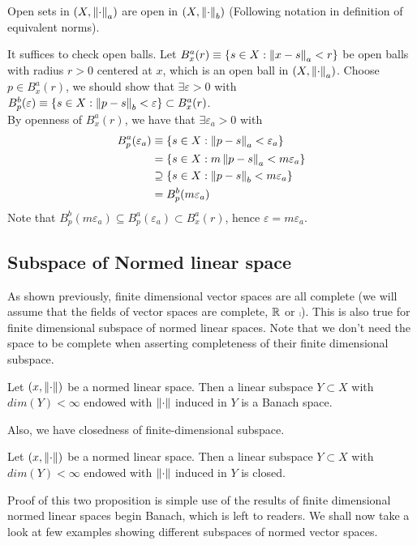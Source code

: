 \begin{proposition}\rm\nextline
	Open sets in $(X,\left\|{\cdot}\right\|_a)$ are open in $(X,\left\|{\cdot}\right\|_b)$ (Following notation in definition of equivalent norms).
	\begin{pf}{}{}
	It suffices to check open balls. Let $B^a_x(r)\equiv\{s\in X:\left\|{x-s}\right\|_a<r\}$ be open balls with radius $r>0$ centered at $x$, which is an open ball in $(X,\left\|{\cdot}\right\|_a)$. Choose $p\in B^a_x(r)$, we should show that $\exists \varepsilon>0$ with $B^b_p(\varepsilon)\equiv\{s\in X:\left\|{p-s}\right\|_b<\varepsilon\}\subset B^a_x(r)$.\\
	By openness of $B^a_x(r)$, we have that $\exists \varepsilon_a>0$ with
	\begin{equation}
		\begin{split}\nonumber
			B^a_p(\varepsilon_a)&\equiv\{s\in X:\left\|{p-s}\right\|_a<\varepsilon_a\}\\
			&=\{s\in X:m\left\|{p-s}\right\|_a<m\varepsilon_a\}\\
			&\supseteq \{s\in X:\left\|{p-s}\right\|_b<m\varepsilon_a\}\\
			&=B^b_p(m\varepsilon_a)
		\end{split}
	\end{equation}
	Note that $B^b_p(m\varepsilon_a)\subseteq B^a_p(\varepsilon_a)\subset B^a_x(r)$, hence $\varepsilon=m\varepsilon_a$.
	\end{pf}
	
\end{proposition}


\subsection{Subspace of Normed linear space}
As shown previously, finite dimensional vector spaces are all complete (we will assume that the fields of vector spaces are complete, $\mathbb{R}$ or $\comp$). This is also true for finite dimensional subspace of normed linear spaces. Note that we don't need the space to be complete when asserting completeness of their finite dimensional subspace.
\begin{proposition}
	\rm\nextline
	Let $(x,\left\|{\cdot}\right\|)$ be a normed linear space. Then a linear subspace $Y\subset X$ with $dim(Y)<\infty$ endowed with $\left\|{\cdot}\right\|$ induced in $Y$ is a Banach space.
\end{proposition}
Also, we have closedness of finite-dimensional subspace.
\begin{proposition}
	\rm\nextline
	Let $(x,\left\|{\cdot}\right\|)$ be a normed linear space. Then a linear subspace $Y\subset X$ with $dim(Y)<\infty$ endowed with $\left\|{\cdot}\right\|$ induced in $Y$ is closed.
\end{proposition}
Proof of this two proposition is simple use of the results of finite dimensional normed linear spaces begin Banach, which is left to readers. We shall now take a look at few examples showing different subspaces of normed vector spaces.

